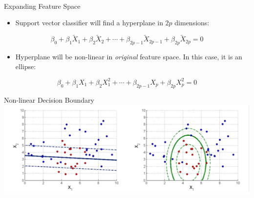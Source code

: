 \begin{frame}{Expanding Feature Space}
    \begin{itemize}
        \item Support vector classifier will find a hyperplane in $2p$ dimensions:
    \end{itemize}

    \[
    \beta_0 + \beta_1 \tilde{X}_1 + \beta_2 \tilde{X}_2 + \cdots + \beta_{2p-1} \tilde{X}_{2p-1} + \beta_{2p} \tilde{X}_{2p} = 0
    \]

    \begin{itemize}
        \item Hyperplane will be non-linear in \textit{original} feature space. In this case, it is an ellipse:
    \end{itemize}

    \[
    \beta_0 + \beta_1 X_1 + \beta_2 X_1^2 + \cdots + \beta_{2p-1} X_p + \beta_{2p} X_p^2 = 0
    \]
\end{frame}


\begin{frame}{Non-linear Decision Boundary}
    \centering
    \includegraphics[width=\textwidth]{images/support-vector-machines/support-vector-machines-19.png}
\end{frame}



